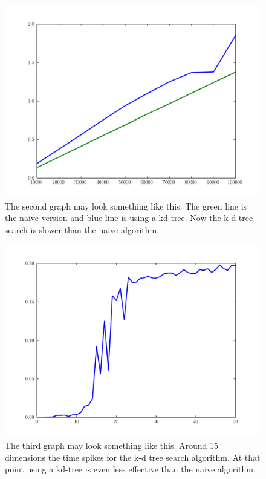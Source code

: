 \begin{problem}
\begin{figure}[H]
\includegraphics[width=\textwidth]{twentyDTime.pdf}
\caption{The second graph may look something like this.
The green line is the naive version and blue line is using a kd-tree.
Now the k-d tree search is slower than the naive algorithm.}
\label{fig:twentyDTime}
\end{figure}

\begin{figure}[H]
\includegraphics[width=\textwidth]{curseD.pdf}
\caption{The third graph may look something like this.
Around 15 dimensions the time spikes for the k-d tree search algorithm.
At that point using a kd-tree is even less effective than the naive algorithm.}
\end{figure}

\end{problem}

